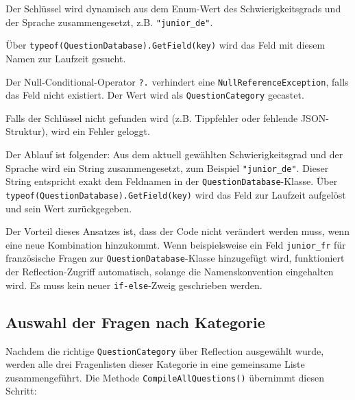 \documentclass[12pt,a4paper]{article}
\begin{document}
\begin{description}[leftmargin=2em, labelwidth=1.5em]
    \item[(1)] Der Schlüssel wird dynamisch aus dem Enum-Wert des Schwierigkeitsgrads und der Sprache zusammengesetzt, z.B. \texttt{"junior\_de"}.
    \item[(2)] Über \texttt{typeof(QuestionDatabase).GetField(key)} wird das Feld mit diesem Namen zur Laufzeit gesucht.
    \item[(3)] Der Null-Conditional-Operator \texttt{?.} verhindert eine \texttt{NullReferenceException}, falls das Feld nicht existiert. Der Wert wird als \texttt{QuestionCategory} gecastet.
    \item[(4)] Falls der Schlüssel nicht gefunden wird (z.B. Tippfehler oder fehlende JSON-Struktur), wird ein Fehler geloggt.
\end{description}

Der Ablauf ist folgender: Aus dem aktuell gewählten Schwierigkeitsgrad und der Sprache wird ein String zusammengesetzt, zum Beispiel \texttt{"junior\_de"}. Dieser String entspricht exakt dem Feldnamen in der \texttt{QuestionDatabase}-Klasse. Über \texttt{typeof(QuestionDatabase).GetField(key)} wird das Feld zur Laufzeit aufgelöst und sein Wert zurückgegeben.

Der Vorteil dieses Ansatzes ist, dass der Code nicht verändert werden muss, wenn eine neue Kombination hinzukommt. Wenn beispielsweise ein Feld \texttt{junior\_fr} für französische Fragen zur \texttt{QuestionDatabase}-Klasse hinzugefügt wird, funktioniert der Reflection-Zugriff automatisch, solange die Namenskonvention eingehalten wird. Es muss kein neuer \texttt{if-else}-Zweig geschrieben werden.

\subsection{Auswahl der Fragen nach Kategorie}

Nachdem die richtige \texttt{QuestionCategory} über Reflection ausgewählt wurde, werden alle drei Fragenlisten dieser Kategorie in eine gemeinsame Liste zusammengeführt. Die Methode \texttt{CompileAllQuestions()} übernimmt diesen Schritt:
\end{document}
